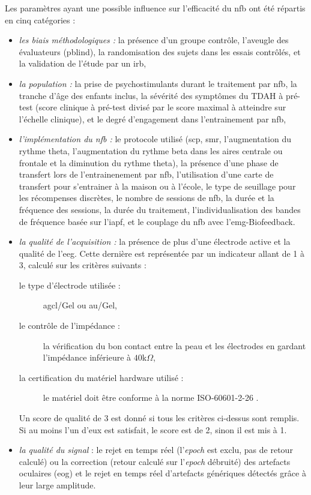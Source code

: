 Les paramètres ayant une possible influence sur l'efficacité du \gls{nfb} ont été répartis en cinq catégories :
\renewcommand{\labelitemi}{$\bullet$}
\begin{itemize}
\item \emph{les biais méthodologiques :} la présence d'un groupe contrôle, l'aveugle des évaluateurs (\gls{pblind}), la randomisation des sujets dans les essais contrôlés, et la validation de l'étude 
par un \gls{irb},
\item \emph{la population :} la prise de psychostimulants durant le traitement par \gls{nfb}, la tranche d'âge des enfants inclus, la sévérité des symptômes du TDAH à pré-test (score clinique à pré-test
divisé par le score maximal à atteindre sur l'échelle clinique), et le degré d'engagement dans l'entrainement par \gls{nfb},
\item \emph{l'implémentation du \gls{nfb} :} le protocole utilisé (\gls{scp}, \gls{smr}, l'augmentation du rythme theta, l'augmentation du rythme beta dans les aires centrale ou frontale 
et la diminution du rythme theta), la présence d'une phase de transfert lors de l'entrainenement par \gls{nfb}, l'utilisation d'une carte de transfert pour s'entrainer à la maison ou à l'école, 
le type de seuillage pour les récompenses discrètes, le nombre de sessions de \gls{nfb}, la durée et la fréquence des sessions, la durée du traitement, l'individualisation des bandes de fréquence
basée sur l'\gls{iapf}, et le couplage du \gls{nfb} avec l'\gls{emg}-Biofeedback.
\item \emph{la qualité de l'acquisition :} la présence de plus d'une électrode active et la qualité de l'\gls{eeg}. Cette dernière est représentée par un indicateur allant de 1 à 3, calculé sur les critères 
suivants : 
\begin{description} 
\item[le type d'électrode utilisée :] \gls{agcl}/Gel ou \gls{au}/Gel,
\item[le contrôle de l'impédance :] la vérification du bon contact entre la peau et les électrodes en gardant l'impédance inférieure à $40$k$\Omega$,
\item[la certification du matériel hardware utilisé :] le matériel doit être conforme à la norme ISO-60601-2-26 \citep{ISO}.
\end{description}

Un score de qualité de 3 est donné si tous les critères ci-dessus sont remplis. Si au moins l'un d'eux est satisfait, le score est de 2, sinon il est mis à 1.

\item \emph{la qualité du signal} : le rejet en temps réel (l'\textit{epoch} est exclu, pas de retour calculé) ou la correction (retour calculé sur l'\textit{epoch} débruité) des 
artefacts oculaires (\gls{eog}) et le rejet en temps réel d'artefacts génériques détectés grâce à leur large amplitude. 
\end{itemize}

